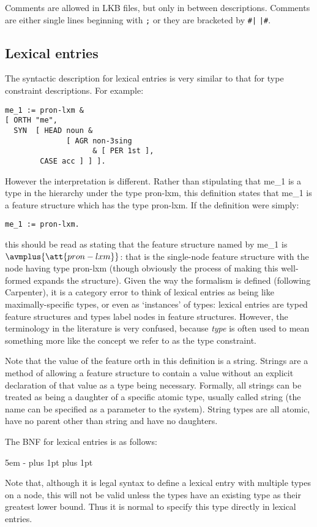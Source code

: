 \documentclass[12pt]{report}
\newcommand{\newterm}[1]{{\it #1}}
\begin{document}
Comments are allowed in LKB files, but only in between descriptions.
Comments are either single lines
beginning with {\tt ;} or they are bracketed by {\tt \#|} {\tt |\#}.



\subsection{Lexical entries}
\label{lexsyntax}
The syntactic description for lexical entries is
very similar to that for type constraint descriptions.  For example:
\begin{verbatim}
me_1 := pron-lxm & 
[ ORTH "me",
  SYN  [ HEAD noun & 
              [ AGR non-3sing 
                    & [ PER 1st ],
		CASE acc ] ] ].
\end{verbatim}
However the interpretation is different.  Rather than
stipulating that me\_1 is a type in the hierarchy under the
type {\type pron-lxm}, this definition 
states that me\_1 is a feature structure which has the
type {\type pron-lxm}.  If the definition were simply:
\begin{verbatim}
me_1 := pron-lxm.
\end{verbatim}
this should be
read as stating that the feature structure named by me\_1 is
{\tiny $\avmplus{\att{pron-lxm}}$}: that is the single-node 
feature structure with the node having type {\type pron-lxm}
(though obviously the process of making this well-formed expands the
structure).
Given the way the formalism is defined (following Carpenter),
it is a category error to
think of lexical entries as being like maximally-specific types,
or even as `instances' of types: lexical entries are typed feature 
structures and types label nodes in feature structures.
However, the terminology in the literature is very confused,
because \newterm{type} is often used to mean something more like the concept
we refer to as the type constraint.  

Note that the value of the feature {\feature orth} in this
definition is a string.
Strings are a method of allowing a feature structure to contain a 
value without an explicit declaration of that value as a type
being necessary.  Formally, all strings can be treated as
being a daughter of a specific atomic type, usually called {\type string}
(the name can be specified as a parameter to the system).
String types are all atomic,
have no parent other than {\type string} and have no daughters.

The BNF for lexical entries is as follows:
\begin{list}{}
   {\leftmargin 5em
    \itemindent -\leftmargin
    \itemsep 0pt plus 1pt
    \parsep 0pt plus 1pt}
\end{list}
Note that, although it is legal syntax to define a 
lexical entry with multiple types on a node,
this will not be valid unless the types have an
existing type as their greatest lower bound.
Thus it is normal to specify this type directly
in lexical entries.
\end{document}
